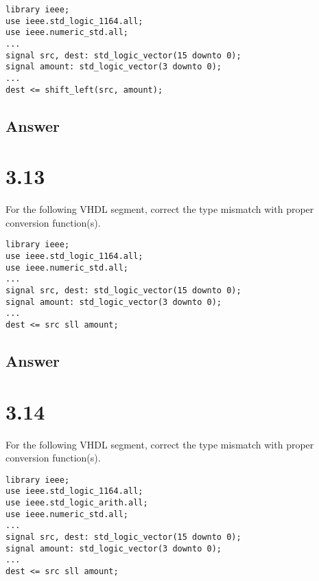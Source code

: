 \documentclass[dvipsnames, svgnames, x11names, a4paper,12pt]{article}
\begin{document}
\begin{lstlisting}
library ieee;
use ieee.std_logic_1164.all;
use ieee.numeric_std.all;
...
signal src, dest: std_logic_vector(15 downto 0);
signal amount: std_logic_vector(3 downto 0);
...
dest <= shift_left(src, amount);

\end{lstlisting}
\subsection{Answer}
\section{3.13}    
For the following VHDL segment, correct the type mismatch with proper conversion
function(s).
\begin{lstlisting}
library ieee;
use ieee.std_logic_1164.all;
use ieee.numeric_std.all;
...
signal src, dest: std_logic_vector(15 downto 0);
signal amount: std_logic_vector(3 downto 0);
...
dest <= src sll amount;   
\end{lstlisting}
\subsection{Answer}
\section{3.14}    
 For the following VHDL segment, correct the type mismatch with proper conversion
function(s).
\begin{lstlisting}
library ieee;
use ieee.std_logic_1164.all;
use ieee.std_logic_arith.all;
use ieee.numeric_std.all;
...
signal src, dest: std_logic_vector(15 downto 0);
signal amount: std_logic_vector(3 downto 0);
...
dest <= src sll amount;
\end{lstlisting}
\end{document}
